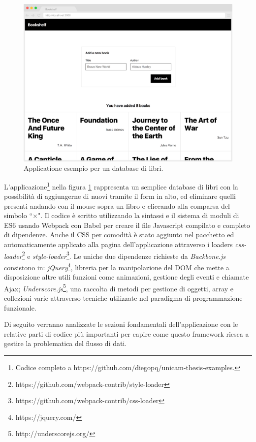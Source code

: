 \begin{figure}[h]
\centering
\includegraphics[width=14cm]{./images/bookshelfApplication1}
\caption{Applicatione esempio per un database di libri.}
\label{bookshelfApplication1}
\end{figure}

L'applicazione\footnote{Codice completo a https://github.com/diegopq/unicam-thesis-examples.} nella figura \ref{bookshelfApplication1} rappresenta un semplice database di libri con la possibilità di aggiungerne di nuovi tramite il form in alto, ed eliminare quelli presenti andando con il mouse sopra un libro e cliccando alla comparsa del simbolo “×".
Il codice è scritto utilizzando la sintassi e il sistema di moduli di ES6 usando Webpack con Babel per creare il file Javascript compilato e completo di dipendenze. Anche il CSS per comodità è stato aggiunto nel pacchetto ed automaticamente applicato alla pagina dell'applicazione attraverso i loaders \textit{css-loader}\footnote{https://github.com/webpack-contrib/style-loader} e \textit{style-loader}\footnote{https://github.com/webpack-contrib/css-loader}.
Le uniche due dipendenze richieste da \textit{Backbone.js} consistono in: \textit{jQuery}\footnote{https://jquery.com/}, libreria per la manipolazione del DOM che mette a disposizione altre utili funzioni come animazioni, gestione degli eventi e chiamate Ajax; \textit{Underscore.js}\footnote{http://underscorejs.org/}, una raccolta di metodi per gestione di oggetti, array e collezioni varie attraverso tecniche utilizzate nel paradigma di programmazione funzionale.

\noindent
Di seguito verranno analizzate le sezioni fondamentali dell'applicazione con le relative parti di codice più importanti per capire come questo framework riesca a gestire la problematica del flusso di dati.

